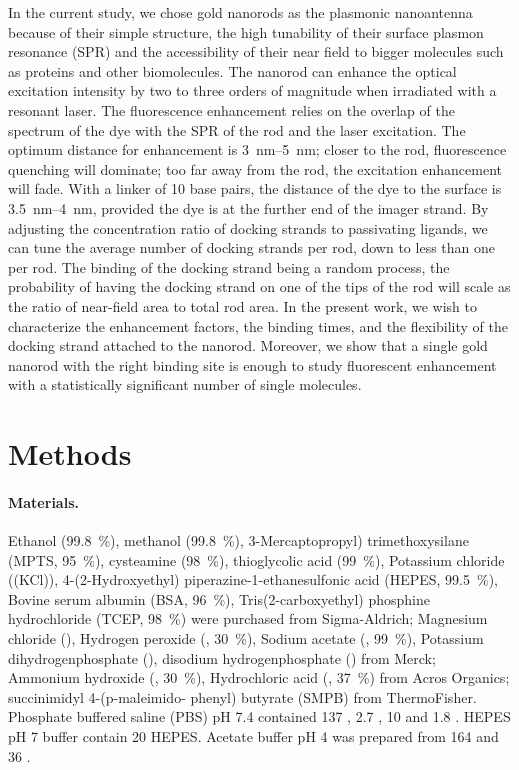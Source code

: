 In the current study, we chose gold nanorods as the plasmonic nanoantenna because of their simple structure, the high tunability of their surface plasmon resonance (SPR) and the accessibility of their near field to bigger molecules such as proteins and other biomolecules.
The nanorod can enhance the optical excitation intensity by two to three orders of magnitude when irradiated with a resonant laser.
The fluorescence enhancement relies on the overlap of the spectrum of the dye with the SPR of the rod and the laser excitation.
The optimum distance for enhancement is \SIrange{3}{5}{\nm}; closer to the rod, fluorescence quenching will dominate; too far away from the rod, the excitation enhancement will fade.\cite{khatua2014resonant}
With a linker of 10 base pairs, the distance of the dye to the surface is \SIrange{3.5}{4}{\nm}, provided the dye is at the further end of the imager strand.
By adjusting the concentration ratio of docking strands to passivating ligands, we can tune the average number of docking strands per rod, down to less than one per rod. The binding of the docking strand being a random process, the probability of having the docking strand on one of the tips of the rod will scale as the ratio of near-field area to total rod area.
In the present work, we wish to characterize the enhancement factors, the binding times, and the flexibility of the docking strand attached to the nanorod. Moreover, we show that a single gold nanorod with the right binding site is enough to study fluorescent enhancement with a statistically significant number of single molecules.


\section{Methods}
\paragraph*{Materials.} Ethanol (\SI{99.8}{\percent}), methanol (\SI{99.8}{\percent}), 3-Mercaptopropyl) trimethoxysilane (MPTS, \SI{95}{\percent}), cysteamine (\SI{98}{\percent}), thioglycolic acid (\SI{99}{\percent}), Potassium chloride (\ce(KCl)), 4-(2-Hydroxyethyl) piperazine-1-ethanesulfonic acid (HEPES, \SI{99.5}{\percent}), Bovine serum albumin (BSA, \SI{96}{\percent}), Tris(2-carboxyethyl) phosphine hydrochloride (TCEP, \SI{98}{\percent}) were purchased from Sigma-Aldrich; 
Magnesium chloride (), Hydrogen peroxide (, \SI{30}{\percent}), Sodium acetate (, \SI{99}{\percent}), Potassium dihydrogenphosphate (), disodium hydrogenphosphate () from Merck;
Ammonium hydroxide (, \SI{30}{\percent}), Hydrochloric acid (, \SI{37}{\percent}) from Acros Organics;
succinimidyl 4-(p-maleimido- phenyl) butyrate (SMPB) from ThermoFisher.
Phosphate buffered saline (PBS) pH 7.4 contained \SI{137}{\mM} , \SI{2.7}{\mM} , \SI{10}{\mM}  and \SI{1.8}{\mM} .
HEPES pH 7 buffer contain \SI{20}{\mM} HEPES. Acetate buffer pH 4 was prepared from \SI{164}{\mM}  and \SI{36}{\mM} .


